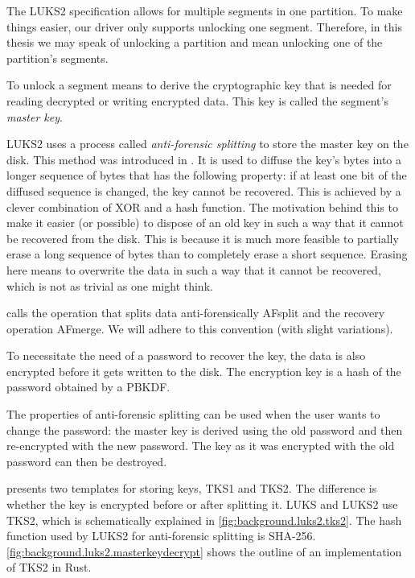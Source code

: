 The LUKS2 specification allows for multiple segments in one partition. To make things easier, our driver only supports unlocking one segment. Therefore, in this thesis we may speak of unlocking a partition and mean unlocking one of the partition's segments.

To unlock a segment means to derive the cryptographic key that is needed for reading decrypted or writing encrypted data. This key is called the segment's \emph{master key}.

LUKS2 uses a process called \emph{anti-forensic splitting} to store the master key on the disk. This method was introduced in \cite{Fruhwirth2005}. It is used to diffuse the key's bytes into a longer sequence of bytes that has the following property: if at least one bit of the diffused sequence is changed, the key cannot be recovered. This is achieved by a clever combination of XOR and a hash function. The motivation behind this to make it easier (or possible) to dispose of an old key in such a way that it cannot be recovered from the disk. This is because it is much more feasible to partially erase a long sequence of bytes than to completely erase a short sequence. Erasing here means to overwrite the data in such a way that it cannot be recovered, which is not as trivial as one might think.

\cite{Fruhwirth2005} calls the operation that splits data anti-forensically AFsplit and the recovery operation AFmerge. We will adhere to this convention (with slight variations).

To necessitate the need of a password to recover the key, the data is also encrypted before it gets written to the disk. The encryption key is a hash of the password obtained by a PBKDF.

The properties of anti-forensic splitting can be used when the user wants to change the password: the master key is derived using the old password and then re-encrypted with the new password. The key as it was encrypted with the old password can then be destroyed.

\cite{Fruhwirth2005} presents two templates for storing keys, TKS1 and TKS2. The difference is whether the key is encrypted before or after splitting it. LUKS and LUKS2 use TKS2, which is schematically explained in \autoref{fig:background.luks2.tks2}. The hash function used by LUKS2 for anti-forensic splitting is SHA-256. \autoref{fig:background.luks2.masterkeydecrypt} shows the outline of an implementation of TKS2 in Rust.

